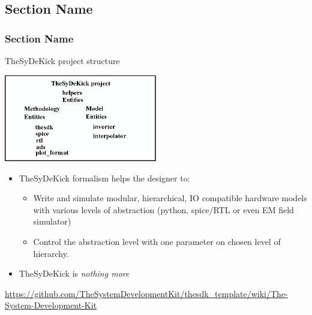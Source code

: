 \documentclass{sdkslides}
\newcommand{\sectname}{Section Name}
\begin{document}
\subsection*{\sectname}
\begin{frame}[t]
    \frametitle{\sectname}
    \begin{block}{TheSyDeKick project structure}
        \begin{center}
            \includegraphics[width=0.5\textwidth]{Pics/TheSyDeKick-entity-principles.eps}
        \end{center}
    \end{block}
    \begin{itemize}
       \item TheSyDeKick formalism helps the designer to: 
        \begin{itemize}
            \item Write and simulate modular, hierarchical, IO compatible
                hardware models with various levels of abstraction (python,
                spice/RTL or even EM field simulator)
            \item Control the abstraction level with one parameter on
                chosen level of hierarchy.
        \end{itemize}
        \item TheSyDeKick is \emph{nothing more}
    \end{itemize}
        {\tiny
        \url{https://github.com/TheSystemDevelopmentKit/thesdk_template/wiki/The-System-Development-Kit}}
\end{frame}


\renewcommand{\sectname}{How it is costructed?}
\end{document}
